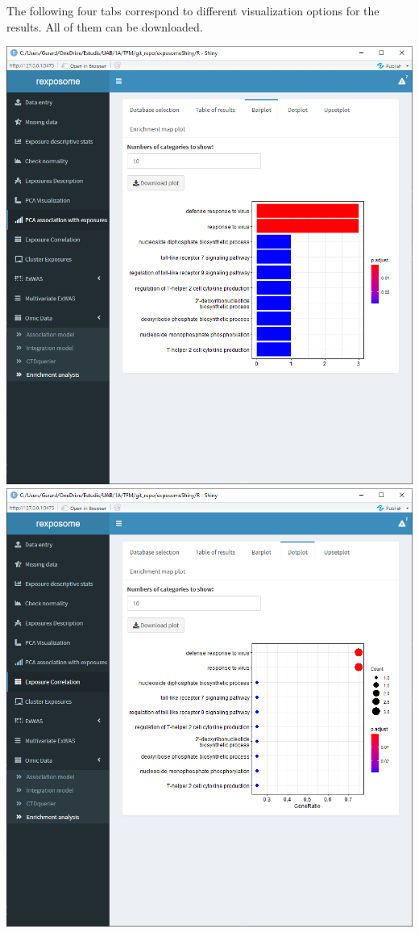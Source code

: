 \documentclass[
]{book}
\begin{document}
The following four tabs correspond to different visualization options for the results. All of them can be downloaded.

\includegraphics{images/analysis11_3.png}
\includegraphics{images/analysis11_4.png}
\end{document}
